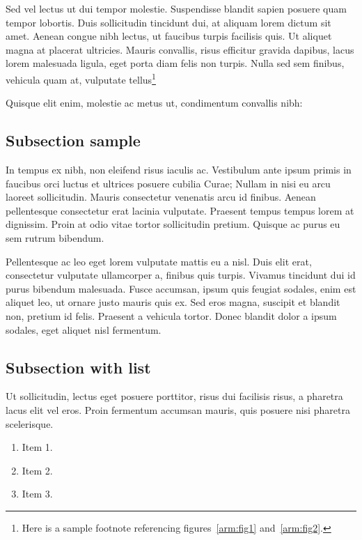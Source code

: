 Sed vel lectus ut dui tempor molestie. Suspendisse blandit sapien posuere quam tempor lobortis. Duis sollicitudin tincidunt dui, at aliquam lorem dictum sit amet. Aenean congue nibh lectus, ut faucibus turpis facilisis quis. Ut aliquet magna at placerat ultricies. Mauris convallis, risus efficitur gravida dapibus, lacus lorem malesuada ligula, eget porta diam felis non turpis. Nulla sed sem finibus, vehicula quam at, vulputate tellus\footnote{Here is a sample footnote referencing figures~\ref{arm:fig1}
and~\ref{arm:fig2}.}  

Quisque elit enim, molestie ac metus ut, condimentum convallis nibh:

\subsection{Subsection sample}

In tempus ex nibh, non eleifend risus iaculis ac. Vestibulum ante ipsum primis in faucibus orci luctus et ultrices posuere cubilia Curae; Nullam in nisi eu arcu laoreet sollicitudin. Mauris consectetur venenatis arcu id finibus. Aenean pellentesque consectetur erat lacinia vulputate. Praesent tempus tempus lorem at dignissim. Proin at odio vitae tortor sollicitudin pretium. Quisque ac purus eu sem rutrum bibendum.

%

Pellentesque ac leo eget lorem vulputate mattis eu a nisl. Duis elit erat, consectetur vulputate ullamcorper a, finibus quis turpis. Vivamus tincidunt dui id purus bibendum malesuada. Fusce accumsan, ipsum quis feugiat sodales, enim est aliquet leo, ut ornare justo mauris quis ex. Sed eros magna, suscipit et blandit non, pretium id felis. Praesent a vehicula tortor. Donec blandit dolor a ipsum sodales, eget aliquet nisl fermentum.

\subsection{Subsection with list}

Ut sollicitudin, lectus eget posuere porttitor, risus dui facilisis risus, a pharetra lacus elit vel eros. Proin fermentum accumsan mauris, quis posuere nisi pharetra scelerisque. 
\begin{enumerate}
  \item Item 1.
  \item Item 2.
  \item Item 3.
\end{enumerate}

